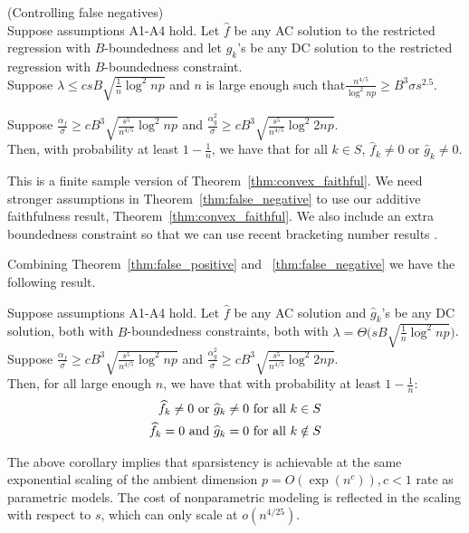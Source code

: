 \begin{theorem} (Controlling false negatives) \\
\label{thm:false_negative}
Suppose assumptions A1-A4 hold. Let $\hat{f}$ be any AC solution to the restricted regression with $B$-boundedness and let $\hat{g}_k$'s be any DC solution to the restricted regression with $B$-boundedness constraint.\\

Suppose $\lambda \leq c sB  \sqrt{\frac{1}{n} \log^2 np}$ and $n$ is large enough such that$\frac{n^{4/5}}{\log^2 np} \geq B^3 \sigma s^{2.5}$.

Suppose 
$\frac{\alpha_f}{\sigma} \geq c B^3 \sqrt{\frac{s^5}{n^{4/5}} \log^2 np}$ and $\frac{\alpha_g^2}{\sigma} \geq c B^3 \sqrt{\frac{s^5}{n^{4/5}} \log^2 2np}$.\\

Then, with probability at least $1 - \frac{1}{n}$, we have that for all $k \in S$, $\hat{f}_k \neq 0$ or $\hat{g}_k \neq 0$.

\end{theorem}

This is a finite sample version of
Theorem~\ref{thm:convex_faithful}. We need stronger assumptions in
Theorem~\ref{thm:false_negative} to use our additive faithfulness
result, Theorem~\ref{thm:convex_faithful}. We also include an extra
boundedness constraint so that we can use recent bracketing number
results \cite{kim2014global}.

Combining Theorem~\ref{thm:false_positive} and
~\ref{thm:false_negative} 
we have the following result.
\begin{corollary}
Suppose assumptions A1-A4 hold. Let $\hat{f}$ be any AC solution and $\hat{g}_k$'s be any DC solution, both with $B$-boundedness constraints, both with 
$\lambda = \Theta \Big( sB \sqrt{\frac{1}{n} \log^2 np} \Big)$. \\


Suppose 
$\frac{\alpha_f}{\sigma} \geq c B^3 \sqrt{\frac{s^5}{n^{4/5}} \log^2 np}$ and $\frac{\alpha_g^2}{\sigma} \geq c B^3 \sqrt{\frac{s^5}{n^{4/5}} \log^2 2np}$.\\

Then, for all large enough $n$, we have that with probability at least $1-\frac{1}{n}$:
\begin{align*}
\widehat{f}_k \neq 0 \textrm{ or } \widehat{g}_k \neq 0 &\textrm{ for all } k \in S\\
\widehat{f}_k = 0 \textrm{ and } \widehat{g}_k = 0 & \textrm{ for all } k \notin S
\end{align*}



\end{corollary}
The above corollary implies that sparsistency is achievable at the same exponential scaling of the ambient dimension $p = O(\exp(n^c)), c<1$ rate as parametric models. The cost of nonparametric modeling is reflected in the scaling with respect to $s$, which can only scale at $o(n^{4/25})$.


